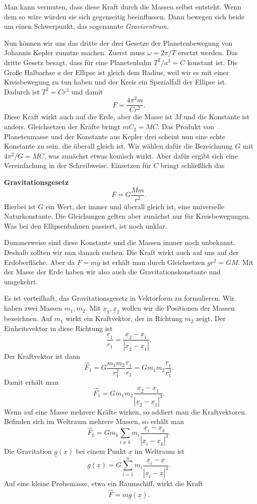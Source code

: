 \documentclass[a4paper,10pt,fleqn,twocolumn,twoside]{article}
\begin{document}
Man kann vermuten, dass diese Kraft durch die Massen selbst entsteht.
Wenn dem so wäre würden sie sich gegenseitig beeinflussen. Dann
bewegen sich beide um einen Schwerpunkt,
das sogenannte \textit{Gravizentrum}.

Nun können wir uns das dritte der drei Gesetze der Planetenbewegung
von Johannis Kepler zunutze machen. Zuerst muss $\omega=2\pi/T$
ersetzt werden. Das dritte Gesetz besagt, dass für eine
Planetenbahn $T^2/a^3=C$ konstant ist. Die Große Halbachse
$a$ der Ellipse ist gleich dem Radius, weil wir es mit einer
Kreisbewegung zu tun haben und der Kreis ein Spezialfall der
Ellipse ist. Dadurch ist $T^2=Cr^3$ und damit
\[F = \frac{4\pi^2 m}{Cr^2}.\]
Diese Kraft wirkt auch auf die Erde, aber die Masse ist $M$
und die Konstante ist anders. Gleichsetzen der Kräfte
bringt $mC_2=MC$. Das Produkt von Planetenmasse und der Konstante
aus Kepler drei scheint nun eine echte Konstante zu sein, die überall
gleich ist. Wir wählen dafür
die Bezeichnung $G$ mit $4\pi^2/G=MC$, was zunächst etwas komisch
wirkt. Aber dafür ergibt sich eine Vereinfachung in der Schreibweise.
Einsetzen für $C$ bringt schließlich das

\textbf{Gravitationsgesetz}
\[F = G \frac{Mm}{r^2}.\]
Hierbei ist $G$ ein Wert, der immer und überall gleich ist, eine
universelle Naturkonstante. Die Gleichungen gelten aber zunächst
nur für Kreisbewegungen. Was bei den Ellipsenbahnen passiert,
ist noch unklar.

Dummerweise sind diese Konstante und die Massen immer noch unbekannt.
Deshalb sollten wir nun danach suchen. Die Kraft wirkt auch auf
uns auf der Erdoberfläche. Aber da $F=mg$ ist erhält man durch
Gleichsetzen $gr^2=GM$. Mit der Masse der Erde haben wir also auch
die Gravitationskonstante und umgekehrt.

Es ist vorteilhaft, das Gravitationsgesetz in Vektorform zu
formulieren. Wir haben zwei Massen $m_1, m_2$.
Mit $\underline x_1, \underline x_2$ wollen wir die Positionen
der Massen bezeichnen. Auf $m_1$ wirkt ein Kraftvektor, der in
Richtung $m_2$ zeigt. Der Einheitsvektor in diese Richtung ist
\[\frac{\underline r_1}{r_1} = \frac{\underline x_2-\underline x_1}
{|\underline x_2-\underline x_1|}.\]
Der Kraftvektor ist dann
\[\vec F_1 = G \frac{m_1m_2}{r_1^2}\frac{\underline r_1}{r_1}
= Gm_1m_2\frac{\underline r_1}{r_1^3}.\]
Damit erhält man
\[\vec F_1 = Gm_1m_2\frac{\underline x_2-\underline x_1}
{|\underline x_2-\underline x_1|^3}.\]
Wenn auf eine Masse mehrere Kräfte wirken, so addiert man die
Kraftvektoren. Befinden sich im Weltraum mehrere Massen,
so erhält man
\[\vec F_k = Gm_k\sum_{i\ne k}m_i\frac{\underline x_i-\underline x_k}
{|\underline x_i-\underline x_k|^3}.\]
Die Gravitation $\underline g(\underline x)$ bei einem
Punkt $\underline x$ im Weltraum ist
\[\underline g(\underline x)
= G\sum_{i=1}^n m_i\frac{\underline x_i-\underline x}
{|\underline x_i-\underline x|^3}.\]
Auf eine kleine Probemasse, etwa ein Raumschiff, wirkt die Kraft
\[\vec F = m\underline g(\underline x).\]
\end{document}
